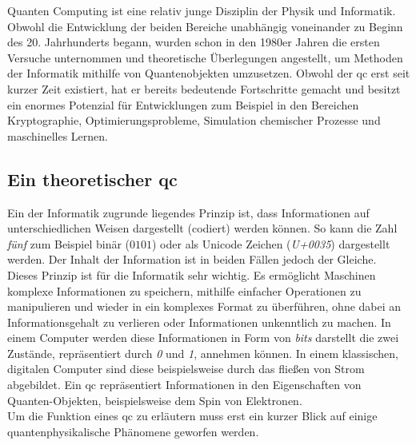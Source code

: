 Quanten Computing ist eine relativ junge Disziplin der Physik und Informatik. Obwohl die Entwicklung der beiden Bereiche unabhängig voneinander zu Beginn des 20. Jahrhunderts begann, wurden schon in den 1980er Jahren die ersten Versuche unternommen und theoretische Überlegungen angestellt, um Methoden der Informatik mithilfe von Quantenobjekten umzusetzen. Obwohl der \ac{qc} erst seit kurzer Zeit existiert, hat er bereits bedeutende Fortschritte gemacht und besitzt ein enormes Potenzial für Entwicklungen zum Beispiel in den Bereichen Kryptographie, Optimierungsprobleme, Simulation chemischer Prozesse und maschinelles Lernen.

\subsection{Ein theoretischer \ac{qc}}
Ein der Informatik zugrunde liegendes Prinzip ist, dass \cite[S122]{steane_quantum_1998} Informationen auf unterschiedlichen Weisen dargestellt (codiert) werden können. So kann die Zahl \textit{fünf} zum Beispiel binär ($0101$) oder als Unicode Zeichen (\textit{U+0035}) dargestellt werden. Der Inhalt der Information ist in beiden Fällen jedoch der Gleiche.\\
Dieses Prinzip ist für die Informatik sehr wichtig. Es ermöglicht Maschinen komplexe Informationen zu speichern, mithilfe einfacher Operationen zu manipulieren und wieder in ein komplexes Format zu überführen, ohne dabei an Informationsgehalt zu verlieren oder Informationen unkenntlich zu machen. In einem Computer werden diese Informationen in Form von \textit{bits} darstellt die zwei Zustände, repräsentiert durch \textit{0} und \textit{1}, annehmen können. In einem klassischen, digitalen Computer sind diese beispielsweise durch das fließen von Strom abgebildet. Ein \ac{qc} repräsentiert Informationen in den Eigenschaften von Quanten-Objekten, beispielsweise dem Spin von Elektronen.\\
Um die Funktion eines \ac{qc} zu erläutern muss erst ein kurzer Blick auf einige quantenphysikalische Phänomene geworfen werden.


